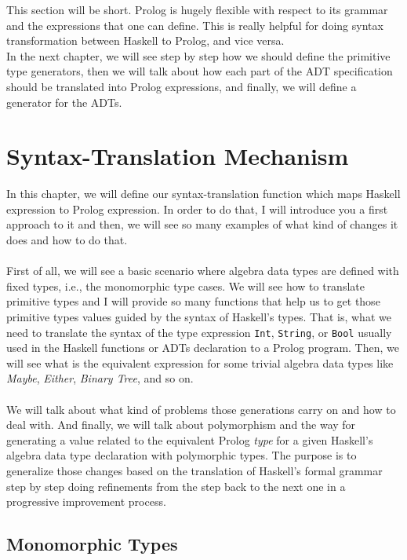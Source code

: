 \documentclass{report}
\theoremstyle{definition}
\theoremstyle{definition}
\newcommand{\ttt}[1]{\texttt{#1}}
\begin{document}
This section will be short. Prolog is hugely flexible with respect to its grammar and the expressions that one can define. This is really helpful for doing syntax transformation between Haskell to Prolog, and vice versa.\\

In the next chapter, we will see step by step how we should define the primitive type generators, then we will talk about how each part of the ADT specification should be translated into Prolog expressions, and finally, we will define a generator for the ADTs.

\chapter{Syntax-Translation Mechanism}

In this chapter, we will define our syntax-translation function which maps Haskell expression to Prolog expression. In order to do that, I will introduce you a first approach to it and then, we will see so many examples of what kind of changes it does and how to do that.\\\\
First of all, we will see a basic scenario where algebra data types are defined with fixed types, i.e., the monomorphic type cases. We will see how to translate primitive types and I will provide so many functions that help us to get those primitive types values guided by the syntax of Haskell's types. That is, what we need to translate the syntax of the type expression \ttt{Int}, \ttt{String}, or \ttt{Bool} usually used in the Haskell functions or ADTs declaration to a Prolog program. Then, we will see what is the equivalent expression for some trivial algebra data types like \textit{Maybe}, \textit{Either}, \textit{Binary Tree}, and so on.\\\\
We will talk about what kind of problems those generations carry on and how to deal with. And finally, we will talk about polymorphism and the way for generating a value related to the equivalent Prolog \textit{type} for a given Haskell's algebra data type declaration with polymorphic types. The purpose is to generalize those changes based on the translation of Haskell's formal grammar step by step doing refinements from the step back to the next one in a progressive improvement process.

\section{Monomorphic Types} \label{ch:monomorphic-types}
\end{document}
